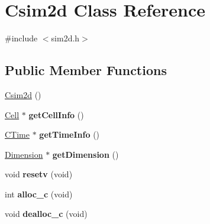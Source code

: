 \hypertarget{class_csim2d}{}\section{Csim2d Class Reference}
\label{class_csim2d}


{\ttfamily \#include $<$sim2d.\+h$>$}

\subsection*{Public Member Functions}
\begin{DoxyCompactItemize}
\item 
\hyperlink{class_csim2d_affde4e1f7fe00b6ba92c08288956d451}{Csim2d} ()
\item 
\hypertarget{class_csim2d_a1639e23620cbf534b015aa4074adae64}{}\hyperlink{struct_cell}{Cell} $\ast$ {\bfseries get\+Cell\+Info} ()\label{class_csim2d_a1639e23620cbf534b015aa4074adae64}

\item 
\hypertarget{class_csim2d_a4aac09519369c7945f855aa81274aa66}{}\hyperlink{struct_c_time}{C\+Time} $\ast$ {\bfseries get\+Time\+Info} ()\label{class_csim2d_a4aac09519369c7945f855aa81274aa66}

\item 
\hypertarget{class_csim2d_ad134d024b0ba921bca6a6ad00314b0d8}{}\hyperlink{struct_dimension}{Dimension} $\ast$ {\bfseries get\+Dimension} ()\label{class_csim2d_ad134d024b0ba921bca6a6ad00314b0d8}

\item 
\hypertarget{class_csim2d_a1b04e59a196f4736173ed7b6434edbd8}{}void {\bfseries resetv} (void)\label{class_csim2d_a1b04e59a196f4736173ed7b6434edbd8}

\item 
\hypertarget{class_csim2d_a9e2c634cb9c4edc9da8f637617919653}{}int {\bfseries alloc\+\_\+c} (void)\label{class_csim2d_a9e2c634cb9c4edc9da8f637617919653}

\item 
\hypertarget{class_csim2d_a31a0f98067ca9cb6780f5fb4db04cbb0}{}void {\bfseries dealloc\+\_\+c} (void)\label{class_csim2d_a31a0f98067ca9cb6780f5fb4db04cbb0}


\end{DoxyCompactItemize}
